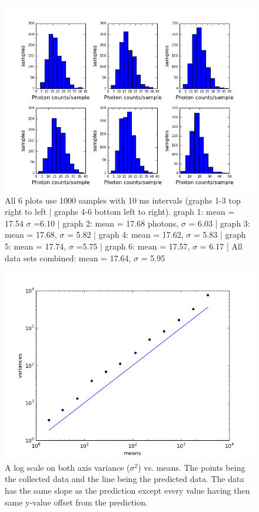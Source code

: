 \documentclass[12 pt,twoside]{article}
\begin{document}
\begin{center}
\begin{figure}[!hb]
\includegraphics[scale=0.7]{figure_4}
\caption{\small All 6 plots use 1000 samples with 10 ms intervals (graphs 1-3 top right to left | graphs 4-6 bottom left to right). graph 1: mean = 17.54 $\sigma$ =6.10 | graph 2: mean = 17.68 photons, $\sigma$ = 6.03 | graph 3: mean = 17.68, $\sigma$ = 5.82 | graph 4: mean = 17.62, $\sigma$ = 5.83  | graph 5: mean = 17.74, $\sigma$ =5.75 | graph 6: mean = 17.57, $\sigma$ = 6.17 | All data sets combined: mean = 17.64, $\sigma$ = 5.95 }
\end{figure}
\end{center}

\begin{center}
\begin{figure}[!hb]
\includegraphics[scale=0.7]{figure_5}
\caption{\small A log scale on both axis variance ($\sigma^2$) vs. means. The points being the collected data and the line being the predicted data. The data has the same slope as the prediction except every value having then same y-value offset from the prediction. }
\end{figure}
\end{center}
\end{document}
